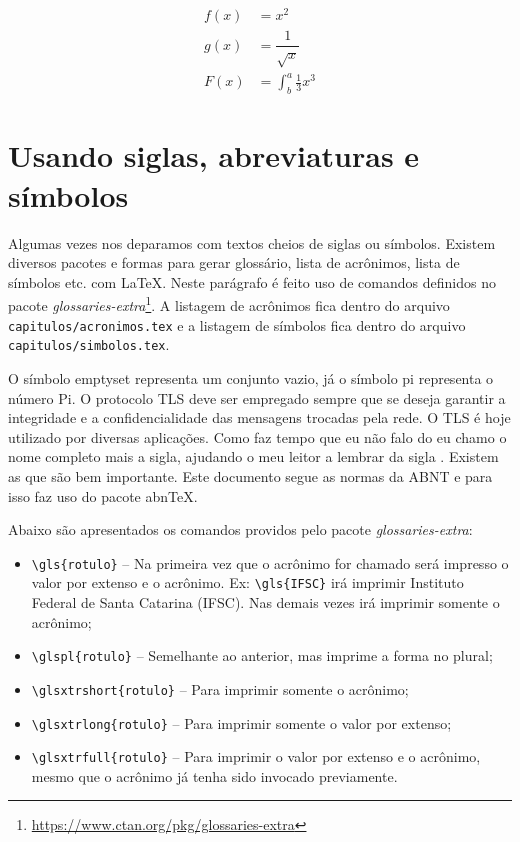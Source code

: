 \begin{align}
f(x) &= x^2 \nonumber\\
g(x) &= \dfrac{1}{\sqrt{x}} \nonumber\\
F(x) &= \int^a_b \frac{1}{3}x^3
\label{e_c2_eq2}
\end{align}

\section{Usando siglas, abreviaturas e símbolos}

Algumas vezes nos deparamos com textos cheios de siglas ou símbolos. Existem diversos pacotes e formas para gerar glossário, lista de acrônimos, lista de símbolos etc. com \LaTeX. Neste parágrafo é feito uso de comandos definidos no pacote \textit{glossaries-extra}\footnote{\url{https://www.ctan.org/pkg/glossaries-extra}}. A listagem de acrônimos fica dentro do arquivo \texttt{capitulos/acronimos.tex} e a listagem de símbolos fica dentro do arquivo \texttt{capitulos/simbolos.tex}.

O símbolo \gls{emptyset} representa um conjunto vazio, já o símbolo \gls{pi} representa o número Pi. O protocolo \gls{TLS} deve ser empregado sempre que se deseja garantir a integridade e a confidencialidade das mensagens trocadas pela rede. O \gls{TLS} é hoje utilizado por diversas aplicações. Como faz tempo que eu não falo do  eu chamo o nome completo mais a sigla, ajudando o meu leitor a lembrar da sigla . Existem as  que são bem importante. Este documento segue as normas da \gls{ABNT} e para isso faz uso do pacote \gls{abnTeX}.

Abaixo são apresentados os comandos providos pelo pacote \textit{glossaries-extra}:

\begin{itemize}
    \item \verb+\gls{rotulo}+ -- Na primeira vez que o acrônimo for chamado será impresso o valor por extenso e o acrônimo. Ex: \verb+\gls{IFSC}+ irá imprimir Instituto Federal de Santa Catarina (IFSC). Nas demais vezes irá imprimir somente o acrônimo;
    \item \verb+\glspl{rotulo}+ -- Semelhante ao anterior, mas imprime a forma no plural;
    \item \verb+\glsxtrshort{rotulo}+ -- Para imprimir somente o acrônimo;
    \item \verb+\glsxtrlong{rotulo}+ -- Para imprimir somente o valor por extenso;
    \item \verb+\glsxtrfull{rotulo}+ -- Para imprimir o valor por extenso e o acrônimo, mesmo que o acrônimo já tenha sido invocado previamente.
\end{itemize}



